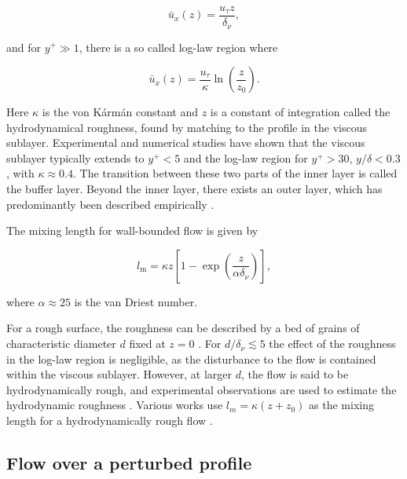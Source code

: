 \documentclass[12pt]{article}
\begin{document}
\begin{equation}
\label{equ:sublayer_vel}
\bar{u}_{x}(z) = \frac{u_{\tau} z}{\delta_{\nu}},
\end{equation}

and for $y^{+} \gg 1$, there is a so called log-law region \citep{vonKarman30} where

\begin{equation}
\label{equ:log_law}
\bar{u}_{x}(z) = \frac{u_{\tau}}{\kappa} \ln\left(\frac{z}{z_{0}}\right).
\end{equation}

Here $\kappa$ is the von K{\'a}rm{\'a}n constant and $z$ is a constant of integration called the hydrodynamical roughness, found by matching to the profile in the viscous sublayer. Experimental and numerical studies have shown that the viscous sublayer typically extends to $y^{+} < 5$ and the log-law region for $y^{+} > 30$, $y / \delta < 0.3$ \citep{Kim87, Wei89}, with $\kappa \approx 0.4$. The transition between these two parts of the inner layer is called the buffer layer. Beyond the inner layer, there exists an outer layer, which has predominantly been described empirically \citep{Pope00}.

The mixing length for wall-bounded flow is given by \citep{Pope00}

\begin{equation}
\label{equ:smooth_mix_length}
l_{\text{m}} = \kappa z \left[1 - \exp\left(\frac{z}{\alpha \delta_{\nu}}\right)\right],
\end{equation}

where $\alpha \approx 25$ is the van Driest number. 

For a rough surface, the roughness can be described by a bed of grains of characteristic diameter $d$ fixed at $z = 0$ \citep{Charru13}. For $d / \delta_{\nu} \lesssim 5$ the effect of the roughness in the log-law region is negligible, as the disturbance to the flow is contained within the viscous sublayer. However, at larger $d$, the flow is said to be hydrodynamically rough, and experimental observations are used to estimate the hydrodynamic roughness \citep{Bagnold41, Kamphuis74}. Various works use $l_{m} = \kappa(z + z_{0})$ as the mixing length for a hydrodynamically rough flow \citep{Fourriere10}.

\subsection{Flow over a perturbed profile}
\label{subsec:obst}
\end{document}
